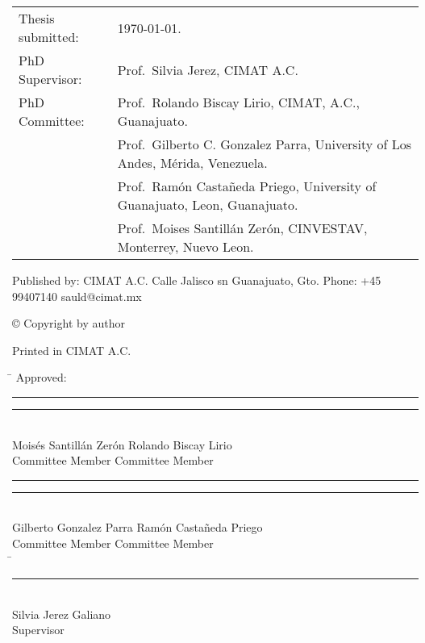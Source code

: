\thispagestyle{empty}
\noindent
\begin{tabularx}{\textwidth}{@{}lX}
    Thesis submitted:	& \today.\\
    PhD Supervisor:		& Prof.\ Silvia Jerez, CIMAT A.C.\\
    PhD Committee:		& Prof.\ Rolando Biscay Lirio, CIMAT, A.C., Guanajuato. \\
					    & Prof.\ Gilberto C. Gonzalez Parra,
					    University of Los Andes, M\'erida, Venezuela.\\						
						& Prof.\ Ram\'on Casta\~{n}eda Priego, University of Guanajuato, Leon, Guanajuato.\\
						& Prof.\ Moises Santill\'an Zer\'on, CINVESTAV, Monterrey, Nuevo Leon. \\
\end{tabularx}
\strut\vfill
\noindent
	\noindent Published by:\newline
	CIMAT A.C. \newline
	Calle Jalisco sn\newline
	Guanajuato, Gto.\newline
	Phone: +45 99407140\newline
	sauld@cimat.mx\newline
	\strut\vfill
	\noindent \copyright{} Copyright by author\newline
	\strut\vfill
	\noindent Printed in CIMAT A.C. 
	\strut\vfill\vfill\vfill
	\clearpage

\begin{tabbing}
	\mbox{\hspace{95mm}}\= \kill
	\huge{Approved}: \\[1.5in]
	\rule{60mm}{.1mm}          \> \rule{60mm}{.1mm}    \\
	Moisés Santillán Zerón     \>  Rolando Biscay Lirio           \\
	Committee Member           \>  Committee Member    \\[1.5in]	
	\rule{60mm}{.1mm}          \>  \rule{60mm}{.1mm}   \\
	Gilberto Gonzalez Parra    \>  Ramón Castañeda Priego \\
	Committee Member           \>  Committee Member\\  [1.5in]
	\mbox{\hspace{47mm}}\= \kill
	\> \rule{60mm}{.1mm}\\
	\> Silvia Jerez Galiano
	\\  
	\>Supervisor \\[.2in]
\end{tabbing}
